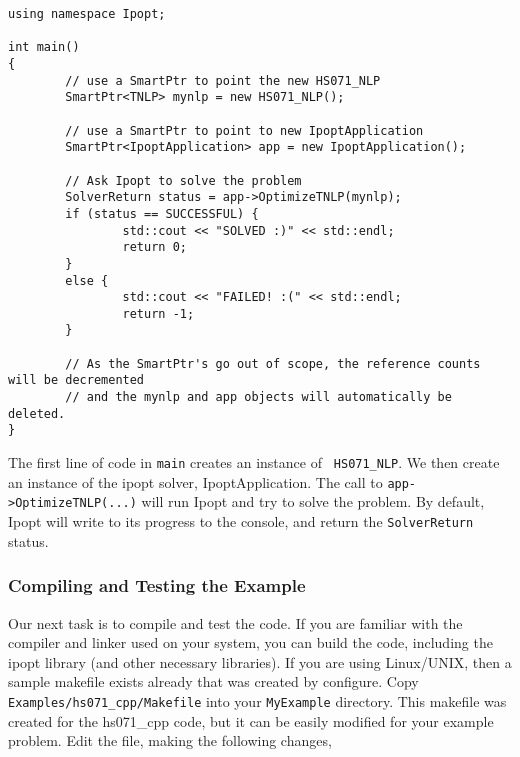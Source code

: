 \documentclass[letter,10pt]{article}
\begin{document}
{\begin{verbatim}
using namespace Ipopt;

int main()
{
        // use a SmartPtr to point the new HS071_NLP
        SmartPtr<TNLP> mynlp = new HS071_NLP();
        
        // use a SmartPtr to point to new IpoptApplication
        SmartPtr<IpoptApplication> app = new IpoptApplication();

        // Ask Ipopt to solve the problem
        SolverReturn status = app->OptimizeTNLP(mynlp);
        if (status == SUCCESSFUL) {
                std::cout << "SOLVED :)" << std::endl;
                return 0;
        }
        else {
                std::cout << "FAILED! :(" << std::endl;
                return -1;
        }
        
        // As the SmartPtr's go out of scope, the reference counts will be decremented
        // and the mynlp and app objects will automatically be deleted.
}
\end{verbatim} 

The first line of code in {\tt main} creates an instance of {\tt
HS071\_NLP}. We then create an instance of the ipopt solver,
IpoptApplication. The call to {\tt app->OptimizeTNLP(...)} will run
Ipopt and try to solve the problem. By default, Ipopt will write to
its progress to the console, and return the {\tt SolverReturn} status.

\subsubsection{Compiling and Testing the Example}
Our next task is to compile and test the code. If you are familiar
with the compiler and linker used on your system, you can build the
code, including the ipopt library (and other necessary libraries).  If
you are using Linux/UNIX, then a sample makefile exists already that was
created by configure. Copy {\tt Examples/hs071\_cpp/Makefile} into
your {\tt MyExample} directory. This makefile was created for the
hs071\_cpp code, but it can be easily modified for your example
problem. Edit the file, making the following changes,

}
\end{document}
